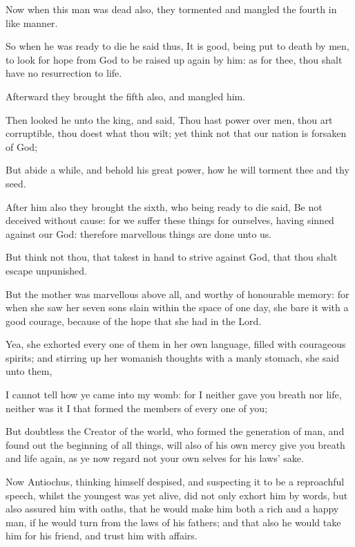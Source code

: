 {\par }{\PP {}Now when this man was dead also, they tormented and mangled the fourth in like manner.
\par }{\PP {}So when he was ready to die he said thus, It is good, being put to death by men, to look for hope from God to be raised up again by him: as for thee, thou shalt have no resurrection to life.
\par }{\PP {}Afterward they brought the fifth also, and mangled him.
\par }{\PP {}Then looked he unto the king, and said, Thou hast power over men, thou art corruptible, thou doest what thou wilt; yet think not that our nation is forsaken of God;
\par }{\PP {}But abide a while, and behold his great power, how he will torment thee and thy seed.
\par }{\PP {}After him also they brought the sixth, who being ready to die said, Be not deceived without cause: for we suffer these things for ourselves, having sinned against our God: therefore marvellous things are done unto us.
\par }{\PP {}But think not thou, that takest in hand to strive against God, that thou shalt escape unpunished.
\par }{\PP {}But the mother was marvellous above all, and worthy of honourable memory: for when she saw her seven sons slain within the space of one day, she bare it with a good courage, because of the hope that she had in the Lord.
\par }{\PP {}Yea, she exhorted every one of them in her own language, filled with courageous spirits; and stirring up her womanish thoughts with a manly stomach, she said unto them,
\par }{\PP {}I cannot tell how ye came into my womb: for I neither gave you breath nor life, neither was it I that formed the members of every one of you;
\par }{\PP {}But doubtless the Creator of the world, who formed the generation of man, and found out the beginning of all things, will also of his own mercy give you breath and life again, as ye now regard not your own selves for his laws’ sake.
\par }{\PP {}Now Antiochus, thinking himself despised, and suspecting it to be a reproachful speech, whilst the youngest was yet alive, did not only exhort him by words, but also assured him with oaths, that he would make him both a rich and a happy man, if he would turn from the laws of his fathers; and that also he would take him for his friend, and trust him with affairs.
}
